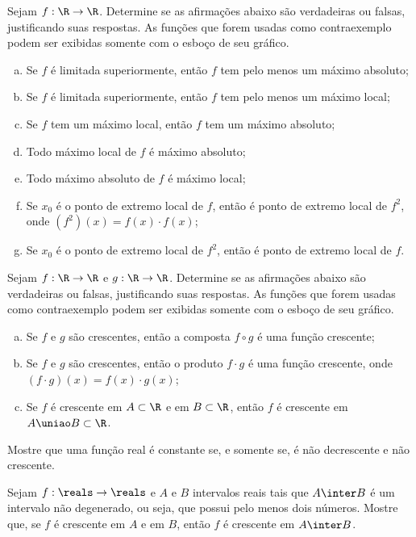 \begin{exercise}
Sejam $f: \R \to \R $. Determine se as afirmações abaixo são
verdadeiras ou falsas, justificando suas respostas. As funções que
forem usadas como contraexemplo podem ser exibidas somente com o
esboço de seu gráfico.
\begin{enumerate}[(a)]
  \item Se $f$ é limitada superiormente, então $f$ tem pelo menos um máximo absoluto;
  \item Se $f$ é limitada superiormente, então $f$ tem pelo menos um máximo local;
  \item Se $f$ tem um máximo local, então $f$ tem um máximo absoluto;
  \item Todo máximo local de $f$ é máximo absoluto;
  \item Todo máximo absoluto de $f$ é máximo local;
  \item Se $x_0$ é o ponto de extremo local de $f$, então é ponto de
  extremo local de $f^2$, onde $(f^2)(x) = f(x) \cdot f(x)$;
  \item Se $x_0$ é o ponto de extremo local de $f^2$, então é ponto de
  extremo local de $f$.
\end{enumerate}
\end{exercise}

\begin{exercise}
Sejam $f: \R \to \R $ e $g: \R \to \R$. Determine se as
afirmações abaixo são verdadeiras ou falsas, justificando suas
respostas. As funções que forem usadas como contraexemplo podem ser
exibidas somente com o esboço de seu gráfico.
\begin{enumerate}[(a)]
  \item Se $f$ e $g$ são crescentes, então a composta $f \circ g$ é uma função crescente;
  \item Se $f$ e $g$ são crescentes, então o produto $f\cdot g$ é
  uma função crescente, onde $(f \cdot g)(x) = f(x) \cdot g(x)$;
  \item Se $f$ é crescente em $A \subset \R$ e em $B \subset \R$, então $f$ é crescente em $A \uniao B \subset \R$.
\end{enumerate}
\end{exercise}

\begin{exercise}
  Mostre que uma função real é constante se, e somente se, é não decrescente e não crescente.
\end{exercise}

\begin{exercise}
  Sejam $f : \reals \to \reals$ e $A$ e $B$ intervalos reais tais que $A \inter B$ é um intervalo não
  degenerado, ou seja, que possui pelo menos dois números. Mostre que, se $f$ é crescente
  em $A$ e em $B$, então $f$ é crescente em $A\inter B$.
\end{exercise}

